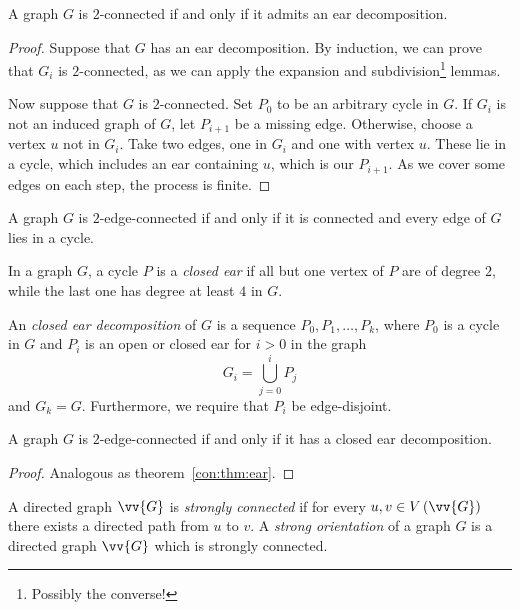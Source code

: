 \begin{izrek}
\label{con:thm:ear}
A graph $G$ is $2$-connected if and only if it admits an ear
decomposition.
\end{izrek}

\begin{proof}
Suppose that $G$ has an ear decomposition. By induction, we can
prove that $G_i$ is $2$-connected, as we can apply the expansion
and subdivision\footnote{Possibly the converse!} lemmas.

Now suppose that $G$ is $2$-connected. Set $P_0$ to be an arbitrary
cycle in $G$. If $G_i$ is not an induced graph of $G$, let
$P_{i+1}$ be a missing edge. Otherwise, choose a vertex $u$ not in
$G_i$. Take two edges, one in $G_i$ and one with vertex $u$. These
lie in a cycle, which includes an ear containing $u$, which is our
$P_{i+1}$. As we cover some edges on each step, the process is
finite.
\end{proof}

\begin{trditev}
A graph $G$ is $2$-edge-connected if and only if it is connected
and every edge of $G$ lies in a cycle.
\end{trditev}

\obvs

\begin{definicija}
In a graph $G$, a cycle $P$ is a \emph{closed ear} if
all but one vertex of $P$ are of degree $2$, while the last one has
degree at least $4$ in $G$.
\end{definicija}

\begin{definicija}
An \emph{closed ear decomposition} of $G$
is a sequence $P_0, P_1, \dots, P_k$, where $P_0$ is a cycle in $G$
and $P_i$ is an open or closed ear for $i > 0$ in the graph
\[
G_i = \bigcup_{j=0}^i P_j
\]
and $G_k = G$. Furthermore, we require that $P_i$ be edge-disjoint.
\end{definicija}

\begin{izrek}
A graph $G$ is $2$-edge-connected if and only if it has a closed
ear decomposition.
\end{izrek}

\begin{proof}
Analogous as theorem~\ref{con:thm:ear}.
\end{proof}


\begin{definicija}
A directed graph $\vv{G}$ is
\emph{strongly connected} if for every
$u, v \in V \br{\vv{G}}$ there exists a directed path from $u$ to
$v$. A \emph{strong orientation} of a
graph $G$ is a directed graph $\vv{G}$ which is strongly connected.
\end{definicija}

